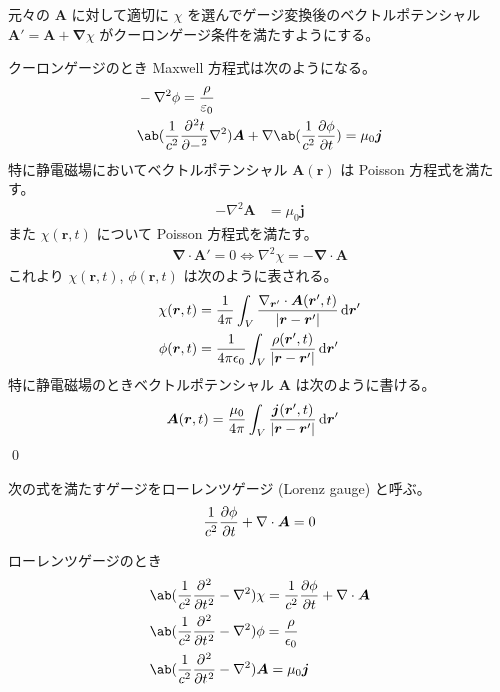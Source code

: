 \documentclass[uplatex,dvipdfmx,a4paper,11pt]{jlreq}
\makeatletter
\renewcommand{\AA}{\bm{A}}
\newcommand{\rr}{\bm{r}}
\newcommand{\vnabla}{\mathbf{\nabla}}
\newcommand{\laplacian}{\nabla^2}
\theoremstyle{definition}
\renewenvironment{proof}[1][\proofname]{\par
  \normalfont
  \topsep6\p@\@plus6\p@ \trivlist
  \item[\hskip\labelsep{\bfseries #1}\@addpunct{\bfseries}]\ignorespaces\quad\par
}{%
  \qed\endtrivlist\@endpefalse
}
\renewcommand\proofname{証明}
\makeatother
\begin{document}
\begin{proposition}
  元々の $\AA$ に対して適切に $\chi$ を選んでゲージ変換後のベクトルポテンシャル $\AA' = \AA + \vnabla\chi$ がクーロンゲージ条件を満たすようにする。
\end{proposition}
\begin{proof}
  クーロンゲージのとき Maxwell 方程式は次のようになる。
  \begin{align}
     & -\laplacian\phi = \frac{\rho}{\varepsilon_0}                                                            \\
     & \ab(\frac{1}{c^2}\diffp[2]{t} - \laplacian)\AA + \vnabla\ab(\frac{1}{c^2}\diffp{\phi}{t}) = \mu_0\bm{j}
  \end{align}
  特に静電磁場においてベクトルポテンシャル $\AA(\rr)$ は Poisson 方程式を満たす。
  \begin{align}
    -\laplacian\AA & = \mu_0\bm{j}
  \end{align}
  また $\chi(\rr, t)$ について Poisson 方程式を満たす。
  \begin{align}
    \vnabla\cdot\AA' = 0 \iff \laplacian\chi = -\vnabla\cdot\AA
  \end{align}
  これより $\chi(\rr, t)$, $\phi(\rr, t)$ は次のように表される。
  \begin{align}
    \chi(\rr, t) & = \frac{1}{4\pi}\int_V\frac{\vnabla_{\rr'}\cdot\AA(\rr', t)}{|\rr - \rr'|}\dl{\rr'} \\
    \phi(\rr, t) & = \frac{1}{4\pi\epsilon_0}\int_V\frac{\rho(\rr', t)}{|\rr - \rr'|}\dl{\rr'}
  \end{align}
  特に静電磁場のときベクトルポテンシャル $\AA$ は次のように書ける。
  \begin{align}
    \AA(\rr, t) & = \frac{\mu_0}{4\pi}\int_V\frac{\bm{j}(\rr', t)}{|\rr - \rr'|}\dl{\rr'}
  \end{align}
\end{proof}

\begin{definition}
  次の式を満たすゲージをローレンツゲージ (Lorenz gauge) と呼ぶ。
  \begin{align}
    \frac{1}{c^2}\diffp{\phi}{t} + \vnabla\cdot\AA = 0
  \end{align}
\end{definition}

\begin{proposition}
  ローレンツゲージのとき
  \begin{align}
     & \ab(\frac{1}{c^2}\diffp[2]{}{t} - \laplacian)\chi = \frac{1}{c^2}\diffp{\phi}{t} + \vnabla\cdot\AA \\
     & \ab(\frac{1}{c^2}\diffp[2]{}{t} - \laplacian)\phi = \frac{\rho}{\epsilon_0}                        \\
     & \ab(\frac{1}{c^2}\diffp[2]{}{t} - \laplacian)\AA = \mu_0\bm{j}
  \end{align}
\end{proposition}
\end{document}
